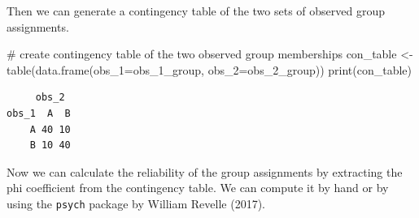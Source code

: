 \documentclass[
  letterpaper,
  DIV=11,
  numbers=noendperiod]{scrreprt}
\newenvironment{Shaded}{\begin{snugshade}}{\end{snugshade}}
\newcommand{\AttributeTok}[1]{\textcolor[rgb]{0.40,0.45,0.13}{#1}}
\newcommand{\CommentTok}[1]{\textcolor[rgb]{0.37,0.37,0.37}{#1}}
\newcommand{\FunctionTok}[1]{\textcolor[rgb]{0.28,0.35,0.67}{#1}}
\newcommand{\NormalTok}[1]{\textcolor[rgb]{0.00,0.23,0.31}{#1}}
\newcommand{\OtherTok}[1]{\textcolor[rgb]{0.00,0.23,0.31}{#1}}
\begin{document}
Then we can generate a contingency table of the two sets of observed
group assignments.

\begin{Shaded}
\begin{Highlighting}[]
\CommentTok{\# create contingency table of the two observed group memberships}
\NormalTok{con\_table }\OtherTok{\textless{}{-}} \FunctionTok{table}\NormalTok{(}\FunctionTok{data.frame}\NormalTok{(}\AttributeTok{obs\_1=}\NormalTok{obs\_1\_group,}
                              \AttributeTok{obs\_2=}\NormalTok{obs\_2\_group))}
\FunctionTok{print}\NormalTok{(con\_table)}
\end{Highlighting}
\end{Shaded}

\begin{verbatim}
     obs_2
obs_1  A  B
    A 40 10
    B 10 40
\end{verbatim}

Now we can calculate the reliability of the group assignments by
extracting the phi coefficient from the contingency table. We can
compute it by hand or by using the \texttt{psych} package by William
Revelle (2017).
\end{document}
